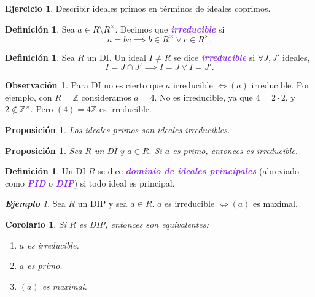 \documentclass{article}
\newtheorem{corollary}[theorem]{Corolario}
\newtheorem{proposition}[theorem]{Proposición}
\theoremstyle{definition}
\newtheorem{definition}[theorem]{Definición}
\newtheorem{exercise}{Ejercicio}
\newtheorem*{obs}{Observación}
\theoremstyle{remark}
\newtheorem{example}[theorem]{\textbf{Ejemplo}}
\numberwithin{equation}{section}
\newcommand{\Z}{\mathbb{Z}}
\renewcommand{\c}{\cdot}
\newcommand{\wea}[1]{\textcolor{BlueViolet}{\textbf{\emph{#1}}}}
\begin{document}
\begin{exercise}
  Describir ideales primos en términos de ideales coprimos.
\end{exercise}

\begin{definition}
  Sea $a \in R \setminus R^\times$. Decimos que \wea{irreducible} si 
  \[ a = bc \implies b \in R^\times \lor c \in R^\times. \]
\end{definition}

\begin{definition}
  Sea $R$ un DI. Un ideal $I \neq R$ se dice \wea{irreducible} si $\forall J,J'$ ideales, 
  \[ I = J \cap J' \implies I=J \lor I=J'. \]
\end{definition}

\begin{obs}
  Para DI no es cierto que $a$ irreducible $\iff (a)$ irreducible. Por ejemplo, con $R = \Z$ consideramos $a = 4$. No es irreducible, ya que $4 = 2 \c 2$, y $2 \notin \Z^\times$. Pero $(4) = 4\Z$ es irreducible.
\end{obs}

\begin{proposition}
  Los ideales primos son ideales irreducibles.
\end{proposition}

\begin{proposition}
  Sea $R$ un DI y $a \in R$. Si $a$ es primo, entonces es irreducible.
\end{proposition}

\begin{definition}
  Un DI $R$ se dice \wea{dominio de ideales principales} (abreviado como \wea{PID} o \wea{DIP}) si todo ideal es principal.
\end{definition}

\begin{example}
  Sea $R$ un DIP y sea $a \in R$. $a$ es irreducible $\iff (a)$ es maximal.
\end{example} %

\begin{corollary}
  Si $R$ es DIP, entonces son equivalentes: 
  \begin{enumerate}[(1)]
    \item $a$ es irreducible.
    \item $a$ es primo.
    \item $(a)$ es maximal.
  \end{enumerate}
\end{corollary}
\end{document}
